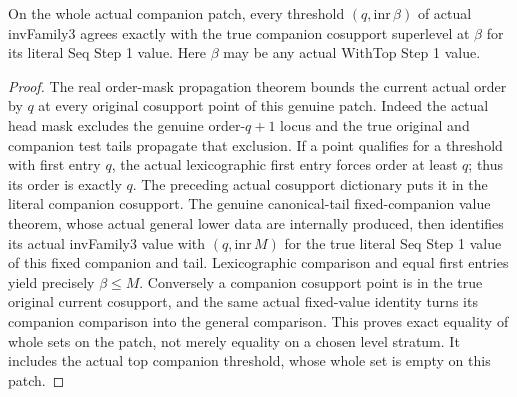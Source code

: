 \begin{lemma}
\label{hir:general-three-actual-companion-threshold-dictionary}
\leanok
On the whole actual companion patch, every threshold $(q,\mathrm{inr}\,\beta)$
of actual invFamily3 agrees exactly with the true companion cosupport
superlevel at $\beta$ for its literal Seq Step 1 value. Here $\beta$
may be any actual WithTop Step 1 value.
\end{lemma}
\begin{proof}
The real order-mask propagation theorem bounds the current actual order
by $q$ at every original cosupport point of this genuine patch. Indeed
the actual head mask excludes the genuine order-$q+1$ locus and the true
original and companion test tails propagate that exclusion. If a point
qualifies for a threshold with first entry $q$, the actual lexicographic
first entry forces order at least $q$; thus its order is exactly $q$.
The preceding actual cosupport dictionary puts it in the literal
companion cosupport. The genuine canonical-tail fixed-companion value
theorem, whose actual general lower data are internally produced, then
identifies its actual invFamily3 value with $(q,\mathrm{inr}\,M)$ for
the true literal Seq Step 1 value of this fixed companion and tail.
Lexicographic comparison and equal first entries yield precisely
$\beta\le M$. Conversely a companion cosupport point is in the true
original current cosupport, and the same actual fixed-value identity
turns its companion comparison into the general comparison. This proves
exact equality of whole sets on the patch, not merely equality on a
chosen level stratum. It includes the actual top companion threshold,
whose whole set is empty on this patch.
\end{proof}


